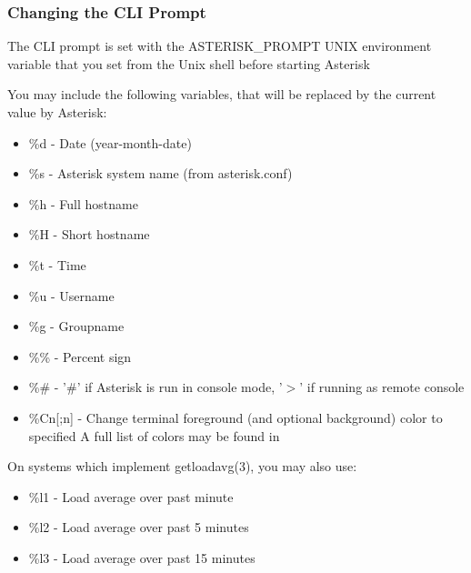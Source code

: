 \subsubsection{Changing the CLI Prompt}

The CLI prompt is set with the ASTERISK\_PROMPT UNIX environment variable that
you set from the Unix shell before starting Asterisk

You may include the following variables, that will be replaced by
the current value by Asterisk:

\begin{itemize}
    \item \%d - Date (year-month-date)
    \item \%s - Asterisk system name (from asterisk.conf)
    \item \%h - Full hostname
    \item \%H - Short hostname
    \item \%t - Time
    \item \%u - Username
    \item \%g - Groupname
    \item \%\% - Percent sign
    \item \%\# - '\#' if Asterisk is run in console mode, '$>$' if running as remote console
    \item \%Cn[;n] - Change terminal foreground (and optional background) color to specified
    A full list of colors may be found in 
\end{itemize}

On systems which implement getloadavg(3), you may also use:

\begin{itemize}
    \item \%l1 - Load average over past minute
    \item \%l2 - Load average over past 5 minutes
    \item \%l3 - Load average over past 15 minutes
\end{itemize}
